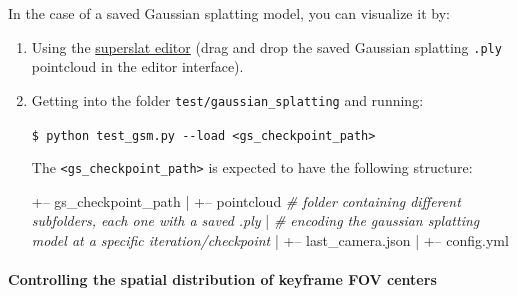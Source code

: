 \documentclass{article}
\newenvironment{Shaded}{\begin{snugshade}}{\end{snugshade}}
\newcommand{\BuiltInTok}[1]{\textcolor[rgb]{0.74,0.68,0.62}{#1}}
\newcommand{\ExtensionTok}[1]{\textcolor[rgb]{0.74,0.68,0.62}{#1}}
\newcommand{\NormalTok}[1]{\textcolor[rgb]{0.74,0.68,0.62}{#1}}
\let\oldparagraph\paragraph
\renewcommand{\paragraph}[1]{\oldparagraph{#1}\mbox{}}
\newcommand{\codeline}[1]{\texttt{\NormalTok{\$ }\BuiltInTok{\ExtensionTok{#1}}}}
\newenvironment{codeblock}
{
\begin{scriptsize}
\begin{Shaded}
}
{
\end{Shaded}
\end{scriptsize}
}
\begin{document}
In the case of a saved Gaussian splatting model, you can visualize it
by: 
\begin{enumerate}
\item Using the
\href{https://playcanvas.com/supersplat/editor}{superslat editor} (drag
and drop the saved Gaussian splatting \texttt{.ply} pointcloud in the
editor interface). 

\item Getting into the folder
\texttt{test/gaussian\_splatting} and running:\\
\begin{codeblock}
\codeline{python\ test\_gsm.py\ -\/-load\ \textless{}gs\_checkpoint\_path\textgreater{}}
\end{codeblock}

The \texttt{<gs\_checkpoint\_path>} is expected to have the following structure:\\
\begin{scriptsize}
\begin{Shaded}
\begin{Highlighting}[]
\NormalTok{+-- gs_checkpoint_path}
\NormalTok{|   +-- pointcloud         \textit{# folder containing different subfolders, each one with a saved .ply}}
\NormalTok{|                          \textit{# encoding the gaussian splatting model at a specific iteration/checkpoint}}
\NormalTok{|   +-- last_camera.json}
\NormalTok{|   +-- config.yml}
\end{Highlighting}
\end{Shaded}
\end{scriptsize}

\end{enumerate}



\hypertarget{controlling-the-spatial-distribution-of-keyframe-fov-centers}{%
\paragraph{Controlling the spatial distribution of keyframe FOV
centers}\label{controlling-the-spatial-distribution-of-keyframe-fov-centers}}
\end{document}
